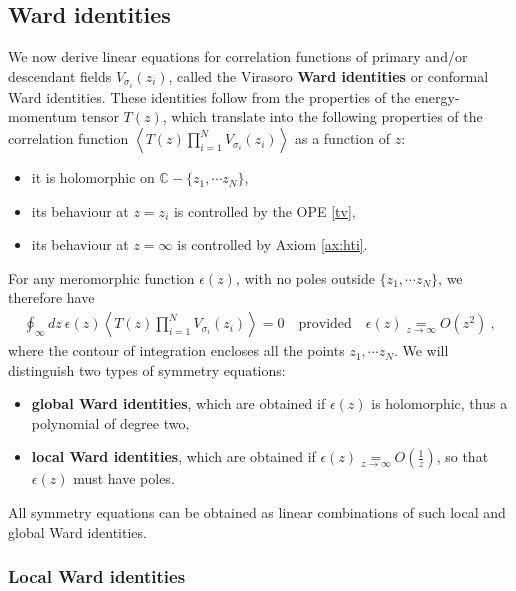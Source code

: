 \documentclass[12pt, a4paper, notitlepage, twoside]{report}
\numberwithin{equation}{section}
\theoremstyle{break}
\begin{document}
\subsection{Ward identities \label{secswi}}

We now derive linear equations for correlation functions of primary and/or descendant fields $V_{\sigma_i}(z_i)$, called the Virasoro \textbf{\boldmath Ward identities} or conformal Ward identities.
These identities follow from the properties of the energy-momentum tensor $T(z)$, which translate into the following properties of the correlation function $\left\langle T(z)\prod_{i=1}^N V_{\sigma_i}(z_i) \right\rangle$ as a function of $z$:
\begin{itemize}
 \item it is holomorphic on ${\mathbb{C}}-\{z_1,\cdots z_N\}$,
\item its behaviour at $z=z_i$ is controlled by the OPE \eqref{tv},
\item its behaviour at $z=\infty$ is controlled by Axiom \ref{ax:hti}.
\end{itemize}
For any meromorphic function $\epsilon(z)$, with no poles outside $\{z_1,\cdots z_N\}$, we therefore have
\begin{align}
 \oint_\infty dz\ \epsilon(z) \left\langle T(z)\prod_{i=1}^N V_{\sigma_i}(z_i) \right\rangle = 0 \quad \text{provided} \quad \epsilon(z)\underset{z\to\infty}{=} O(z^2)\ ,
\label{oiz}
\end{align}
where the contour of integration encloses all the points $z_1,\cdots z_N$.
We will distinguish two types of symmetry equations:
\begin{itemize}
 \item \textbf{\boldmath global Ward identities}, which are obtained if $\epsilon(z)$ is holomorphic, thus a polynomial of degree two, 
\item \textbf{\boldmath local Ward identities}, which are obtained if $\epsilon(z) \underset{z\to\infty}{=} O(\frac{1}{z})$, so that $\epsilon(z)$ must have poles.
\end{itemize}
All symmetry equations can be obtained as linear combinations of such local and global Ward identities.

\subsubsection{Local Ward identities}
\end{document}
